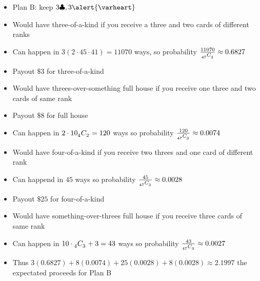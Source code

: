 \documentclass[handout,xcolor=dvipsnames]{beamer}
\theoremstyle{definition}
\newcommand\ncr[2]{\tensor[_{#1}]C{_{#2}}}
\newcommand{\hs}{\alert{\varheart}}
\newcommand{\cs}{\clubsuit}
\begin{document}
\begin{frame}
\begin{itemize}
\item Plan B: keep $3\cs,3\hs$
\item Would have three-of-a-kind if you receive
a three and two cards of different ranks
\item Can happen in $3\left(2\cdot 45\cdot 41\right)
=11070$ ways,
so probability $\frac{11070}{\ncr{47}{3}}\approx 0.6827$
\item Payout $\$3$ for three-of-a-kind
\item Would have threes-over-something full house if
you receive one three and two cards of same rank
\item Payout $\$8$ for full house
\item Can happen in $2\cdot 10\ncr{4}{2}=120$ ways
so probability $\frac{120}{\ncr{47}{3}}\approx 0.0074$
\end{itemize}
\end{frame}

\begin{frame}
\begin{itemize}
\item Would have four-of-a-kind if you receive
two threes and one card of different rank
\item Can happend in $45$ ways
so probability $\frac{45}{\ncr{47}{3}}\approx 0.0028$
\item Payout $\$25$ for four-of-a-kind
\item Would have something-over-threes full house
if you receive three cards of same rank
\item Can happen in $10\cdot\ncr{4}{3}+3=43$ ways
so probability $\frac{43}{\ncr{47}{3}}\approx 0.0027$
\item Thus $3\left(0.6827\right)+8\left(0.0074\right)
+25\left(0.0028\right)+8\left(0.0028\right)
\approx 2.1997$ the expectated proceeds for Plan B
\end{itemize}
\end{frame}

\end{document}
